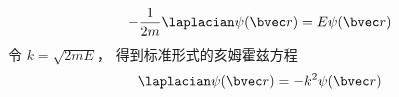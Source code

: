 
\begin{issues}
\issueDraft
\end{issues}


\begin{equation}
-\frac{1}{2m}\laplacian \psi(\bvec r) = E\psi(\bvec r)
\end{equation}
令 $k = \sqrt{2mE}$， 得到标准形式的亥姆霍兹方程
\begin{equation}
\laplacian \psi(\bvec r) = -k^2\psi(\bvec r)
\end{equation}

